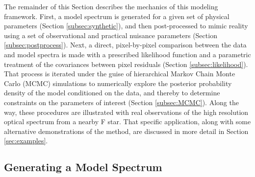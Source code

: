 \documentclass[iop,floatfix,twocolappendix]{emulateapj}
\begin{document}
The remainder of this Section describes the mechanics of this modeling framework.  First, a model 
spectrum is generated for a given set of physical parameters (Section \ref{subsec:synthetic}), and 
then post-processed to mimic reality using a set of observational and practical nuisance parameters 
(Section \ref{subsec:postprocess}).  Next, a direct, pixel-by-pixel comparison between the data and 
model spectra is made with a prescribed likelihood function and a parametric treatment of the 
covariances between pixel residuals (Section \ref{subsec:likelihood}).  That process is iterated 
under the guise of hierarchical Markov Chain Monte Carlo (MCMC) simulations to numerically explore 
the posterior probability density of the model conditioned on the data, and thereby to determine 
constraints on the parameters of interest (Section \ref{subsec:MCMC}).  Along the way, these 
procedures are illustrated with real observations of the high resolution optical spectrum from a 
nearby F star.  That specific application, along with some alternative demonstrations of the 
method, are discussed in more detail in Section \ref{sec:examples}.


\subsection{Generating a Model Spectrum \label{subsec:synthetic}}
\end{document}
